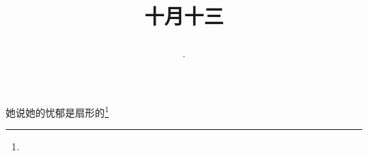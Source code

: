 \title{\date[d=13,m=11,y=2024][year:cn-y,年,month:cn,day:cn,日,·,weekday]·十月十三 }
她说她的忧郁是扇形的\footnote{ }


